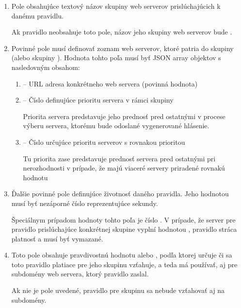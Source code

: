 \begin{enumerate}

    \item {}

    Pole obsahujúce textový názov skupiny web serverov prislúchajúcich k danému pravidlu.
    
    Ak pravidlo neobsahuje toto pole, názov jeho skupiny web serverov bude .
    
    \item {}

    Povinné pole  musí definovať zoznam web serverov, ktoré patria do skupiny  (alebo skupiny ).
    Hodnota tohto poľa musí byť JSON array objektov s nasledovným obsahom:
    \begin{enumerate}
        \item {} -- URL adresa konkrétneho web servera (povinná hodnota)
        \item {} -- Číslo definujúce prioritu servera v rámci skupiny 

        Priorita servera predstavuje jeho prednosť pred ostatnými v procese výberu servera, ktorému bude odoslané vygenerované hlásenie.
        
        \item {} -- Číslo určujúce prioritu serverov s rovnakou prioritou

        Tu priorita zase predstavuje prednosť servera pred ostatnými pri nerozhodnosti v prípade, že majú viaceré servery priradené rovnakú hodnotu 
    \end{enumerate}
    
    \item {}

    Ďalšie povinné pole definujúce životnosť daného pravidla. Jeho hodnotou musí byť nezáporné číslo reprezentujúce sekundy.

    Špeciálnym prípadom hodnoty tohto poľa je číslo . 
    V prípade, že server pre pravidlo prislúchajúce konkrétnej skupine  vyplní  hodnotou , pravidlo stráca platnosť a musí byť vymazané.
    
    \item {}

    Toto pole obsahuje pravdivostnú hodnotu  alebo , podľa ktorej určuje či sa toto pravidlo platiace pre jeho skupinu  vzťahuje, a teda má používať, aj pre subdomény web servera, ktorý pravidlo zaslal.

    Ak nie je pole uvedené, pravidlo pre skupinu  sa nebude vzťahovať aj na subdomény.
    
\end{enumerate}

